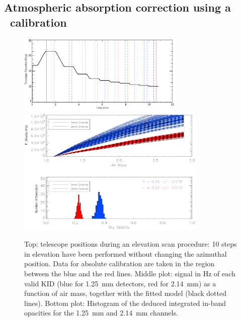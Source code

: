 \subsection{Atmospheric absorption correction using a \Skydip\
  calibration}\label{skydips}

\begin{figure}
\begin{center}
\includegraphics[width=8cm]{figures/Fig_tel.eps} 
\includegraphics[width=9cm]{figures/skydip.eps}
\end{center}
\caption{Top: telescope positions during an elevation scan procedure: 10 steps in elevation have been performed without changing the azimuthal position. Data for absolute calibration are taken in the region
  between the blue and the red lines. Middle plot: signal in Hz of each valid
  KID (blue for 1.25~mm detectors, red for 2.14~mm) as a function of air mass, together with the fitted model (black dotted lines). Bottom plot: Histogram of the deduced
  integrated in-band opacities for the 1.25~mm and 2.14~mm channels.}
\label{fig:skydip}
\end{figure} 


